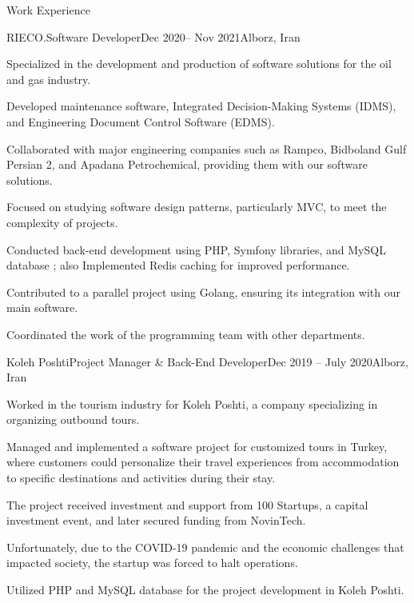 \documentclass[]{kyvernitis-resume}
\begin{document}
\begin{section}{Work Experience}
    \begin{subsection}{RIECO.}{Software Developer}{Dec 2020-- Nov 2021}{Alborz, Iran}
       \item Specialized in the development and production of software solutions for the oil and gas industry.
\item Developed maintenance software, Integrated Decision-Making Systems (IDMS), and Engineering Document Control Software (EDMS).
\item Collaborated with major engineering companies such as Rampco, Bidboland Gulf Persian 2, and Apadana Petrochemical, providing them with our software solutions.
\item Focused on studying software design patterns, particularly MVC, to meet the complexity of projects.
\item Conducted back-end development using PHP, Symfony libraries, and MySQL database ; also Implemented Redis caching for improved performance.
\item Contributed to a parallel project using Golang, ensuring its integration with our main software.
\item Coordinated the work of the programming team with other departments.

    \end{subsection}
    
    \begin{subsection}{Koleh Poshti}{Project Manager \& Back-End Developer}{Dec 2019 -- July 2020}{Alborz, Iran}
        	\item Worked in the tourism industry for Koleh Poshti, a company specializing in organizing outbound tours.

	\item Managed and implemented a software project for customized tours in Turkey, where customers could personalize their travel experiences from accommodation to specific destinations and activities during their stay.

	\item The project received investment and support from 100 Startups, a capital investment event, and later secured funding from NovinTech.

	\item Unfortunately, due to the COVID-19 pandemic and the economic challenges that impacted society, the startup was forced to halt operations.

	\item Utilized PHP and MySQL database for the project development in Koleh Poshti.


\end{subsection}
\end{section}
\end{document}
